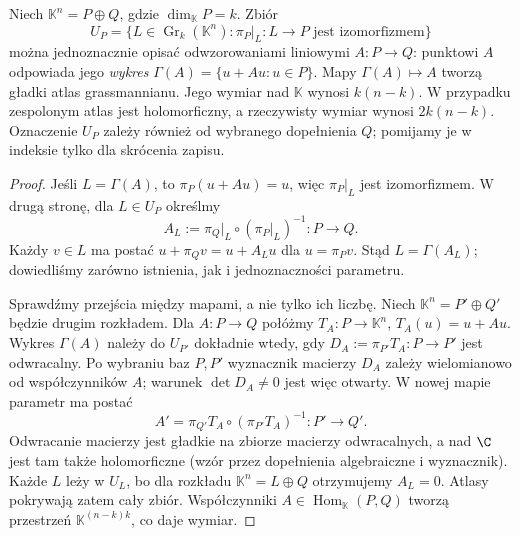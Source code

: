 \begin{twierdzenie}
\label{thm:grass-atlas}
Niech $\mathbb K^n=P\oplus Q$, gdzie $\dim_{\mathbb K}P=k$.
Zbiór
\[
 U_P=\{L\in\operatorname{Gr}_k(\mathbb K^n):
           \pi_P|_L:L\longrightarrow P\text{ jest izomorfizmem}\}
\]
można jednoznacznie opisać odwzorowaniami liniowymi
$A:P\to Q$: punktowi $A$ odpowiada jego
\emph{wykres} $\Gamma(A)=\{u+Au:u\in P\}$.
Mapy $\Gamma(A)\mapsto A$ tworzą gładki atlas
grassmannianu. Jego wymiar nad $\mathbb K$ wynosi
$k(n-k)$. W przypadku zespolonym atlas jest holomorficzny,
a rzeczywisty wymiar wynosi $2k(n-k)$.
Oznaczenie $U_P$ zależy również od wybranego dopełnienia $Q$;
pomijamy je w indeksie tylko dla skrócenia zapisu.
\end{twierdzenie}
\begin{proof}
Jeśli $L=\Gamma(A)$, to $\pi_P(u+Au)=u$, więc
$\pi_P|_L$ jest izomorfizmem. W drugą stronę, dla
$L\in U_P$ określmy
\[
 A_L:=\pi_Q|_L\circ(\pi_P|_L)^{-1}:P\longrightarrow Q.
\]
Każdy $v\in L$ ma postać $u+\pi_Qv=u+A_Lu$
dla $u=\pi_Pv$. Stąd $L=\Gamma(A_L)$; dowiedliśmy
zarówno istnienia, jak i jednoznaczności parametru.

Sprawdźmy przejścia między mapami, a nie tylko ich
liczbę. Niech $\mathbb K^n=P'\oplus Q'$ będzie drugim
rozkładem. Dla $A:P\to Q$ połóżmy
$T_A:P\to\mathbb K^n$, $T_A(u)=u+Au$.
Wykres $\Gamma(A)$ należy do $U_{P'}$ dokładnie wtedy,
gdy $D_A:=\pi_{P'}T_A:P\to P'$ jest odwracalny.
Po wybraniu baz $P,P'$ wyznacznik macierzy $D_A$ zależy
wielomianowo od współczynników $A$;
warunek $\det D_A\ne0$ jest więc otwarty. W nowej mapie
parametr ma postać
\begin{equation}\label{eq:grass-przejscie}
 A'=\pi_{Q'}T_A\circ(\pi_{P'}T_A)^{-1}:P'\longrightarrow Q'.
\end{equation}
Odwracanie macierzy jest gładkie na zbiorze macierzy
odwracalnych, a nad $\C$ jest tam także holomorficzne
(wzór przez dopełnienia algebraiczne i wyznacznik).
Każde $L$ leży w $U_L$, bo dla rozkładu
$\mathbb K^n=L\oplus Q$ otrzymujemy $A_L=0$.
Atlasy pokrywają zatem cały zbiór. Współczynniki
$A\in\operatorname{Hom}_{\mathbb K}(P,Q)$ tworzą
przestrzeń $\mathbb K^{(n-k)k}$, co daje wymiar.


\end{proof}
